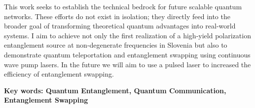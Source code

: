 \documentclass{article}
\theoremstyle{mytheoremstyle}
\theoremstyle{mytheoremstyle}
\theoremstyle{myproblemstyle}
\begin{document}
\par This work seeks to establish the technical bedrock for future scalable quantum networks. These efforts do not exist in isolation;
they directly feed into the broader goal of transforming theoretical quantum advantages into real-world systems.
I aim to achieve not only the first realization of a high-yield polarization entanglement source at non-degenerate
frequencies in Slovenia but also to demonstrate quantum teleportation and entanglement swapping using
continuous wave pump lasers.
In the future we will aim to use a pulsed laser to increased the efficiency of entanglement swapping.
\par\textbf{Key words: Quantum Entanglement, Quantum Communication, Entanglement Swapping}
\end{document}
